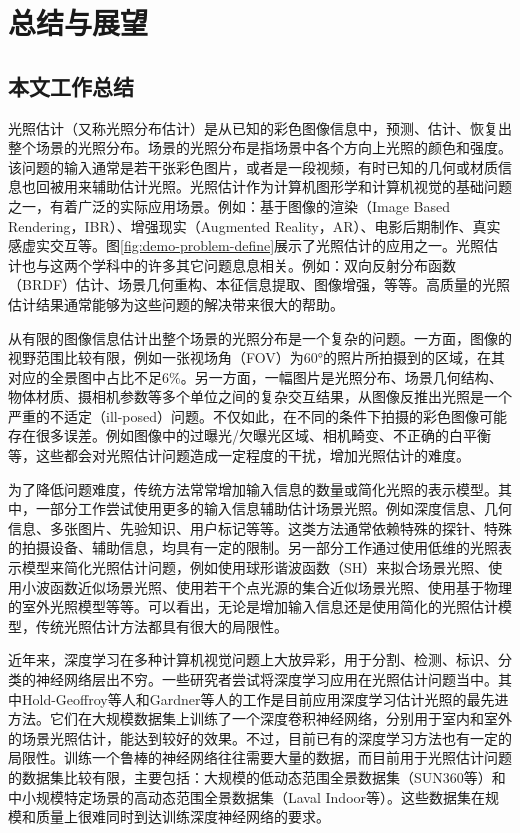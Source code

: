 \chapter{总结与展望}
\section{本文工作总结}
光照估计（又称光照分布估计）是从已知的彩色图像信息中，预测、估计、恢复出整个场景的光照分布。场景的光照分布是指场景中各个方向上光照的颜色和强度。该问题的输入通常是若干张彩色图片，或者是一段视频，有时已知的几何或材质信息也回被用来辅助估计光照。光照估计作为计算机图形学和计算机视觉的基础问题之一，有着广泛的实际应用场景。例如：基于图像的渲染（Image Based Rendering，IBR）、增强现实（Augmented Reality，AR）、电影后期制作、真实感虚实交互等。图\ref{fig:demo-problem-define}展示了光照估计的应用之一。光照估计也与这两个学科中的许多其它问题息息相关。例如：双向反射分布函数（BRDF）估计、场景几何重构、本征信息提取、图像增强，等等。高质量的光照估计结果通常能够为这些问题的解决带来很大的帮助。

从有限的图像信息估计出整个场景的光照分布是一个复杂的问题。一方面，图像的视野范围比较有限，例如一张视场角（FOV）为60°的照片所拍摄到的区域，在其对应的全景图中占比不足6\%。另一方面，一幅图片是光照分布、场景几何结构、物体材质、摄相机参数等多个单位之间的复杂交互结果，从图像反推出光照是一个严重的不适定（ill-posed）问题。不仅如此，在不同的条件下拍摄的彩色图像可能存在很多误差。例如图像中的过曝光/欠曝光区域、相机畸变、不正确的白平衡等，这些都会对光照估计问题造成一定程度的干扰，增加光照估计的难度。

为了降低问题难度，传统方法常常增加输入信息的数量或简化光照的表示模型。其中，一部分工作尝试使用更多的输入信息辅助估计场景光照。例如深度信息、几何信息、多张图片、先验知识、用户标记等等。这类方法通常依赖特殊的探针、特殊的拍摄设备、辅助信息，均具有一定的限制。另一部分工作通过使用低维的光照表示模型来简化光照估计问题，例如使用球形谐波函数（SH）来拟合场景光照、使用小波函数近似场景光照、使用若干个点光源的集合近似场景光照、使用基于物理的室外光照模型等等。可以看出，无论是增加输入信息还是使用简化的光照估计模型，传统光照估计方法都具有很大的局限性。

近年来，深度学习在多种计算机视觉问题上大放异彩，用于分割、检测、标识、分类的神经网络层出不穷。一些研究者尝试将深度学习应用在光照估计问题当中。其中Hold-Geoffroy等人\cite{hold2017deep}和Gardner\cite{gardner2017learning}等人的工作是目前应用深度学习估计光照的最先进方法。它们在大规模数据集上训练了一个深度卷积神经网络，分别用于室内和室外的场景光照估计，能达到较好的效果。不过，目前已有的深度学习方法也有一定的局限性。训练一个鲁棒的神经网络往往需要大量的数据，而目前用于光照估计问题的数据集比较有限，主要包括：大规模的低动态范围全景数据集（SUN360\cite{xiao2012recognizing}等）和中小规模特定场景的高动态范围全景数据集（Laval Indoor等\cite{gardner2017learning}）。这些数据集在规模和质量上很难同时到达训练深度神经网络的要求。

